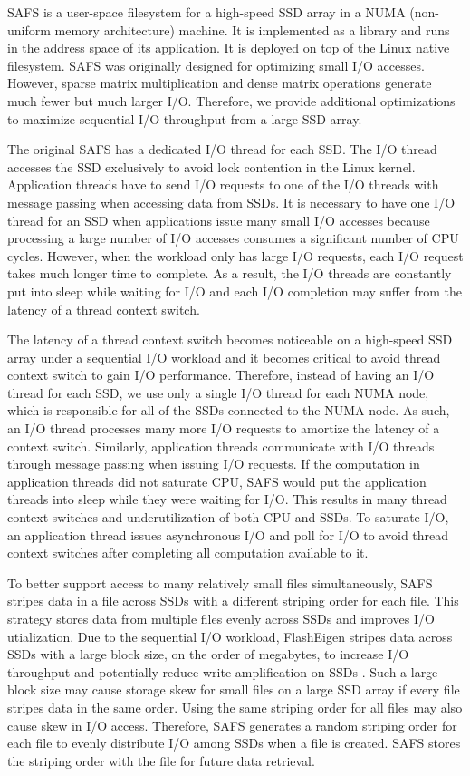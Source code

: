 SAFS \cite{safs} is a user-space filesystem for a high-speed SSD array in
a NUMA (non-uniform memory architecture) machine. It is implemented as
a library and runs in the address space
of its application. It is deployed on top of the Linux native filesystem.
SAFS was originally designed for optimizing small I/O accesses. However,
sparse matrix multiplication and dense matrix operations
generate much fewer but much larger I/O. Therefore, we provide additional
optimizations to maximize sequential I/O throughput from a large SSD array.

The original SAFS has a dedicated I/O thread for each SSD. The I/O thread
accesses the SSD exclusively to avoid lock contention in the Linux kernel.
Application threads have to send I/O requests to one of the I/O threads
with message passing when accessing data from SSDs. It is necessary to have
one I/O thread for
an SSD when applications issue many small I/O accesses because processing
a large number of I/O accesses consumes a significant number of CPU cycles.
However, when the workload only has large I/O requests, each I/O request takes
much longer time to complete. As a result, the I/O threads are constantly put
into sleep while waiting for I/O and each I/O completion may suffer from
the latency of a thread context switch.

The latency of a thread context switch becomes noticeable on a high-speed SSD
array under a sequential I/O workload and it becomes critical to avoid thread
context switch to gain I/O performance. Therefore, instead of having an I/O
thread for each SSD, we use only a single I/O thread for each NUMA node, which
is responsible for all of the SSDs connected to the NUMA node. As such, an I/O
thread processes many more I/O requests to amortize the latency of a context
switch. Similarly, application threads communicate with I/O threads through
message passing when issuing I/O requests. If the computation in application
threads did not saturate CPU, SAFS would put the application threads into
sleep while they were waiting for I/O. This results in many thread context
switches and underutilization of both CPU and SSDs. To saturate I/O,
an application thread issues asynchronous I/O and poll for I/O to avoid thread
context switches after completing all computation available to it.

To better support access to many relatively small files simultaneously, SAFS
stripes data in a file across SSDs with a different striping order for each file.
This strategy stores data from multiple files evenly across SSDs and improves
I/O utialization. Due to the sequential I/O workload, FlashEigen stripes data
across SSDs with a large block size, on the order of megabytes, to increase I/O
throughput and potentially reduce write amplification
on SSDs \cite{}. Such a large block size may cause storage skew for small files
on a large SSD array if every file stripes data in the same order. Using
the same striping order for all files may also cause skew in I/O access.
Therefore, SAFS generates a random striping order for each file to evenly
distribute I/O among SSDs when a file is created. SAFS stores the striping
order with the file for future data retrieval.

